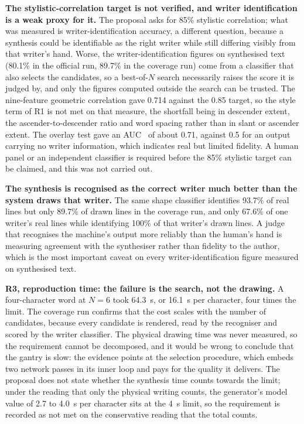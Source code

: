         \textbf{The stylistic-correlation target is not verified, and writer identification is a weak proxy for it.}
        The proposal asks for 85\% stylistic correlation; what was measured is writer-identification accuracy, a different question, because a synthesis could be identifiable as the right writer while still differing visibly from that writer's hand.
        Worse, the writer-identification figures on synthesised text (80.1\% in the official run, 89.7\% in the coverage run) come from a classifier that also selects the candidates, so a best-of-$N$ search necessarily raises the score it is judged by, and only the figures computed outside the search can be trusted.
        The nine-feature geometric correlation gave 0.714 against the 0.85 target, so the style term of R1 is not met on that measure, the shortfall being in descender extent, the ascender-to-descender ratio and word spacing rather than in slant or ascender extent.
        The overlay test gave an AUC~\cite{fawcett2006} of about 0.71, against 0.5 for an output carrying no writer information, which indicates real but limited fidelity.
        A human panel or an independent classifier is required before the 85\% stylistic target can be claimed, and this was not carried out.

        \textbf{The synthesis is recognised as the correct writer much better than the system draws that writer.}
        The same shape classifier identifies 93.7\% of real lines but only 89.7\% of drawn lines in the coverage run, and only 67.6\% of one writer's real lines while identifying 100\% of that writer's drawn lines.
        A judge that recognises the machine's output more reliably than the human's hand is measuring agreement with the synthesiser rather than fidelity to the author, which is the most important caveat on every writer-identification figure measured on synthesised text.

        \textbf{R3, reproduction time: the failure is the search, not the drawing.}
        A four-character word at $N=6$ took 64.3~s, or 16.1~s per character, four times the limit.
        The coverage run confirms that the cost scales with the number of candidates, because every candidate is rendered, read by the recogniser and scored by the writer classifier.
        The physical drawing time was never measured, so the requirement cannot be decomposed, and it would be wrong to conclude that the gantry is slow: the evidence points at the selection procedure, which embeds two network passes in its inner loop and pays for the quality it delivers.
        The proposal does not state whether the synthesis time counts towards the limit; under the reading that only the physical writing counts, the generator's model value of 2.7 to 4.0~s per character sits at the 4~s limit, so the requirement is recorded as not met on the conservative reading that the total counts.

